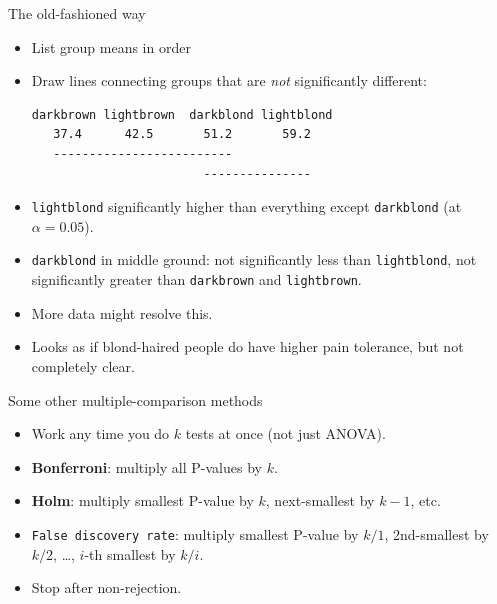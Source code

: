 \documentclass[unknownkeysallowed]{beamer}\usepackage[]{graphicx}\usepackage[]{color}
\begin{document}
\begin{frame}[fragile]{The old-fashioned way}
  
  \begin{itemize}
  \item List group means in order
  \item Draw lines connecting groups that are \emph{not} significantly
    different:
    
\begin{verbatim}
darkbrown lightbrown  darkblond lightblond
   37.4      42.5       51.2       59.2
   -------------------------
                        ---------------
\end{verbatim}

  \item \texttt{lightblond} significantly higher than everything
    except \texttt{darkblond} (at $\alpha=0.05$).
  \item \texttt{darkblond} in middle ground: not significantly less
    than \texttt{lightblond}, not significantly greater than
    \texttt{darkbrown} and \texttt{lightbrown}.
  \item More data might resolve this.
  \item Looks as if blond-haired people do have higher pain tolerance,
    but not completely clear.
  \end{itemize}
  
\end{frame}


\begin{frame}[fragile]{Some other multiple-comparison methods}

  \begin{itemize}
    \item Work any time you do $k$ tests at once (not just ANOVA).
      
    \item \textbf{Bonferroni}: multiply all P-values by $k$.
    \item \textbf{Holm}: multiply smallest P-value by $k$, next-smallest by
      $k-1$, etc.
    \item \texttt{False discovery rate}: multiply smallest P-value by $k/1$,
      2nd-smallest by $k/2$, \ldots, $i$-th smallest by $k/i$.
      
    \item Stop after non-rejection.
  \end{itemize}
  
\end{frame}
\end{document}
